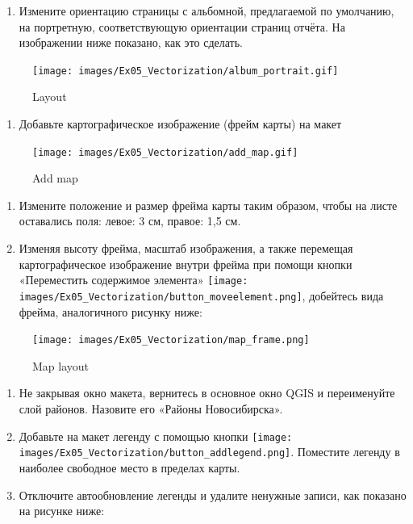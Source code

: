 \documentclass[
  12pt,
]{book}
\providecommand{\tightlist}{%
  \setlength{\itemsep}{0pt}\setlength{\parskip}{0pt}}
\begin{document}
\begin{enumerate}
\def\labelenumi{\arabic{enumi}.}
\setcounter{enumi}{2}
\tightlist
\item
  Измените ориентацию страницы с альбомной, предлагаемой по умолчанию, на портретную, соответствующую ориентации страниц отчёта. На изображении ниже показано, как это сделать.
\end{enumerate}

\begin{figure}
\centering
\texttt{[image: images/Ex05\_Vectorization/album\_portrait.gif]}
\caption{Layout}
\end{figure}

\begin{enumerate}
\def\labelenumi{\arabic{enumi}.}
\setcounter{enumi}{3}
\tightlist
\item
  Добавьте картографическое изображение (фрейм карты) на макет
\end{enumerate}

\begin{figure}
\centering
\texttt{[image: images/Ex05\_Vectorization/add\_map.gif]}
\caption{Add map}
\end{figure}

\begin{enumerate}
\def\labelenumi{\arabic{enumi}.}
\setcounter{enumi}{4}
\item
  Измените положение и размер фрейма карты таким образом, чтобы на листе оставались поля: левое: 3 см, правое: 1,5 см.
\item
  Изменяя высоту фрейма, масштаб изображения, а также перемещая картографическое изображение внутри фрейма при помощи кнопки «Переместить содержимое элемента» \texttt{[image: images/Ex05\_Vectorization/button\_moveelement.png]}, добейтесь вида фрейма, аналогичного рисунку ниже:
\end{enumerate}

\begin{figure}
\centering
\texttt{[image: images/Ex05\_Vectorization/map\_frame.png]}
\caption{Map layout}
\end{figure}

\begin{enumerate}
\def\labelenumi{\arabic{enumi}.}
\setcounter{enumi}{6}
\item
  Не закрывая окно макета, вернитесь в основное окно QGIS и переименуйте слой районов. Назовите его «Районы Новосибирска».
\item
  Добавьте на макет легенду с помощью кнопки \texttt{[image: images/Ex05\_Vectorization/button\_addlegend.png]}. Поместите легенду в наиболее свободное место в пределах карты.
\item
  Отключите автообновление легенды и удалите ненужные записи, как показано на рисунке ниже:
\end{enumerate}
\end{document}
